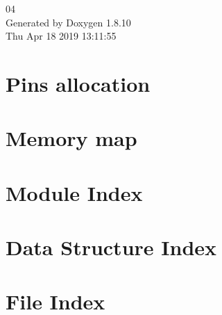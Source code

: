 \documentclass[twoside]{book}
\newcommand{\+}{\discretionary{\mbox{\scriptsize$\hookleftarrow$}}{}{}}
\newcommand{\clearemptydoublepage}{%
  \newpage{\pagestyle{empty}\cleardoublepage}%
}
\begin{document}
\hypersetup{pageanchor=false,
             bookmarks=true,
             bookmarksnumbered=true,
             pdfencoding=unicode
            }
\begin{titlepage}
\vspace*{7cm}
\begin{center}%
{\Large 04 }\\
\vspace*{1cm}
{\large Generated by Doxygen 1.8.10}\\
\vspace*{0.5cm}
{\small Thu Apr 18 2019 13:11:55}\\
\end{center}
\end{titlepage}
\clearemptydoublepage
\tableofcontents
\clearemptydoublepage
{}
\hypersetup{pageanchor=true}

\chapter{Pins allocation}
\label{page_pinalloc}
\hypertarget{page_pinalloc}{}

\chapter{Memory map}
\label{page_memorymap}
\hypertarget{page_memorymap}{}

\chapter{Module Index}

\chapter{Data Structure Index}

\chapter{File Index}

\end{document}
